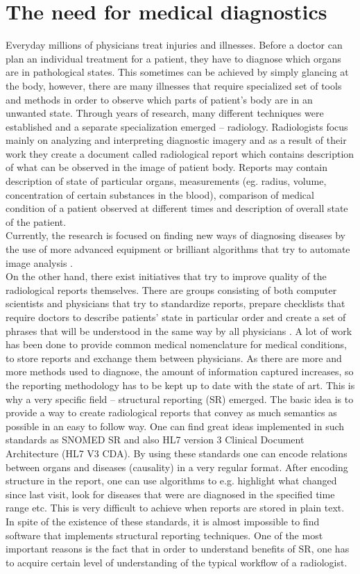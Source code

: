 \documentclass[12pt, twoside, openany]{report}
\theoremstyle{definition}
\begin{document}
\section{The need for medical diagnostics}
Everyday millions of physicians treat injuries and illnesses. Before a doctor can plan an individual treatment for a patient, they have to diagnose which organs are in pathological states\cite{bls}. This sometimes can be achieved by simply glancing at the body, however, there are many illnesses that require specialized set of tools and methods in order to observe which parts of patient's body are in an unwanted state. Through years of research, many different techniques were established and a separate specialization emerged -- radiology. Radiologists focus mainly on analyzing and interpreting diagnostic imagery and as a result of their work they create a document called radiological report which contains description of what can be observed in the image of patient body. Reports may contain description of state of particular organs, measurements (eg. radius, volume, concentration of certain substances in the blood), comparison of medical condition of a patient observed at different times and description of overall state of the patient. \\
Currently, the research is focused on finding new ways of diagnosing diseases by  the use of more advanced equipment or brilliant algorithms that try to automate image analysis \cite{ai}. \\
On the other hand, there exist initiatives that try to improve quality of the radiological reports themselves. There are groups consisting of both computer scientists and physicians that try to standardize reports, prepare checklists that require doctors to describe patients' state in particular order and create a set of phrases that will be understood in the same way by all physicians \cite{snomed}. A lot of work has been done to provide common medical nomenclature for medical conditions, to store reports and exchange them between physicians. As there are more and more methods used to diagnose, the amount of information captured increases, so the reporting methodology has to be kept up to date with the state of art. This is why a very specific field -- structural reporting (SR) emerged. The basic idea is to provide a way to create radiological reports that convey as much semantics as possible in an easy to follow way. One can find great ideas implemented in such standards as SNOMED SR \cite{sr} and also HL7 version 3 Clinical Document Architecture (HL7 V3 CDA). By using these standards one can encode relations between organs and diseases (causality) in a very regular format. After encoding structure in the report, one can use algorithms to e.g. highlight what changed since last visit, look for diseases that were are diagnosed in the specified time range etc. This is very difficult to achieve when reports are stored in plain text. In spite of the existence of these standards, it is almost impossible to find software that implements structural reporting techniques. One of the most important reasons is the fact that in order to understand benefits of SR, one has to acquire certain level of understanding of the typical workflow of a radiologist. 
\end{document}
